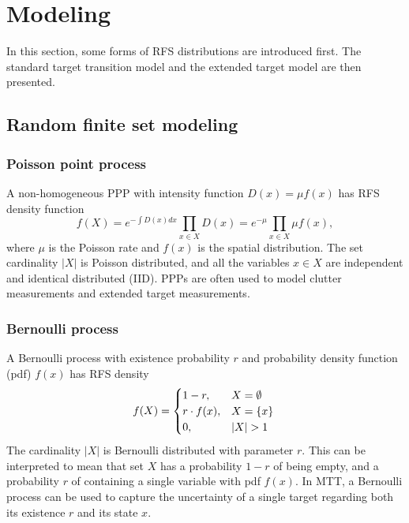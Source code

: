 \section{Modeling}
In this section, some forms of RFS distributions are introduced first. The standard target transition model and the extended target model are then presented. 

\subsection{Random finite set modeling}
\subsubsection{Poisson point process}
A non-homogeneous PPP
with intensity function $D(x)=\mu f(x)$ has RFS density function \cite{pmbmextended2}
\begin{equation}
    f(X) = e^{-\int D(x)dx}\prod_{x\in X}D(x)=e^{-\mu}\prod_{x\in X}\mu f(x),
    \label{eq:poisson}
\end{equation}
where $\mu$ is the Poisson rate and $f(x)$ is the spatial distribution. The set cardinality $|X|$ is Poisson distributed, and all the variables $x\in X$ are independent and identical distributed (IID). PPPs are often used to model clutter measurements and extended target measurements.

\subsubsection{Bernoulli process}
A Bernoulli process with existence probability $r$ and probability density function (pdf) $f(x)$ has RFS density
\begin{equation}
f(X) = 
\begin{cases}
    1-r,& X=\emptyset\\
    r\cdot f(x),& X=\{x\}\\
    0,& |X| > 1
\end{cases}
\label{eq:bernoulli}\\
\end{equation}
The cardinality $|X|$ is Bernoulli distributed with parameter $r$. This can be interpreted to mean that set $X$ has a probability $1-r$ of being empty, and a probability $r$ of containing a single variable with pdf $f(x)$. In MTT, a Bernoulli process can be used to capture the uncertainty of a single target regarding both its existence $r$ and its state $x$. 


